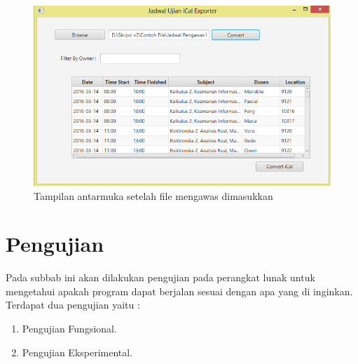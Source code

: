 \begin{enumerate}
		\begin{figure}[H]
		\centering
		\includegraphics[scale=0.7]{Gambar/implementAntarmuka2}
		\caption{Tampilan antarmuka setelah file mengawas dimasukkan}
		\label{fig:implementAntarmukaBag2}
		\end{figure}
\end{enumerate}

\section{Pengujian}
Pada subbab ini akan dilakukan pengujian pada perangkat lunak untuk mengetahui apakah program dapat berjalan sesuai dengan apa yang di inginkan. Terdapat dua pengujian yaitu :
\begin{enumerate}
	\item Pengujian Fungsional.
	\item Pengujian Eksperimental.
\end{enumerate}

